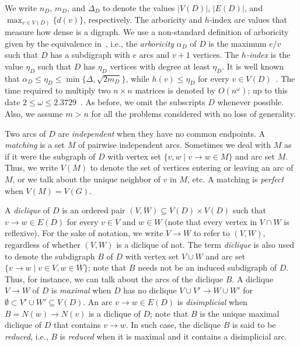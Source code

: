 \documentclass[a4paper,11pt]{article}
\begin{document}
We write $n_D$, $m_D$, and $\Delta_D$ to denote the values $|V(D)|$, $|E(D)|$, and $\max_{v \in V(D)}\{d(v)\}$, respectively.  The arboricity and $h$-index are values that measure how dense is a digraph.  We use a non-standard definition of arboricity given by the equivalence in~\cite{Nash-WilliamsJLMS1964}, i.e., the \emph{arboricity} $\alpha_D$ of $D$ is the maximum $e/v$ such that $D$ has a subdigraph with $e$ arcs and $v+1$ vertices.  The \emph{$h$-index} is the value $\eta_D$ such that $D$ has $\eta_D$ vertices with degree at least $\eta_D$.  It is well known that $\alpha_D \leq \eta_D \leq \min\{\Delta, \sqrt{2m_D}\}$, while $h(v) \leq \eta_D$ for every $v \in V(D)$~\cite{ChibaNishizekiSJC1985,LinSoulignacSzwarcfiterTCS2012}.  The time required to multiply two $n\times n$ matrices is denoted by $O(n^\omega)$; up to this date  $2 \leq \omega \leq 2.3729$~\cite{Williams2012}.  As before, we omit the subscripts $D$ whenever possible.  Also, we assume $m > n$ for all the problems considered with no loss of generality.

Two arcs of $D$ are \emph{independent} when they have no common endpoints.  A \emph{matching} is a set $M$ of pairwise independent arcs.  Sometimes we deal with $M$ as if it were the subgraph of $D$ with vertex set $\{v,w \mid v\to w\in M\}$ and arc set $M$.  Thus, we write $V(M)$ to denote the set of vertices entering or leaving an arc of $M$, or we talk about the unique neighbor of $v$ in $M$, etc.  A matching is \emph{perfect} when $V(M) = V(G)$.  

A \emph{diclique} of $D$ is an ordered pair $(V, W) \subseteq V(D) \times V(D)$ such that $v \to w \in E(D)$ for every $v \in V$ and $w \in W$ (note that every vertex in $V \cap W$ is reflexive).  For the sake of notation, we write $V \to W$ to refer to $(V, W)$, regardless of whether $(V, W)$ is a diclique of not.  The term \emph{diclique} is also used to denote the subdigraph $B$ of $D$ with vertex set $V \cup W$ and arc set $\{v \to w \mid v \in V, w \in W\}$; note that $B$ needs not be an induced subdigraph of $D$.  Thus, for instance, we can talk about the arcs of the diclique $B$.  A diclique $V \to W$ of $D$ is \emph{maximal} when $D$ has no diclique $V \cup V' \to W \cup W'$ for $\emptyset \subset V' \cup W' \subseteq V(D)$.  An arc $v\to w \in E(D)$ is \emph{disimplicial} when $B = N(w) \to N(v)$ is a diclique of $D$; note that $B$ is the unique maximal diclique of $D$ that contains $v \to w$.  In such case, the diclique $B$ is said to be \emph{reduced}, i.e., $B$ is \emph{reduced} when it is maximal and it contains a disimplicial arc.
\end{document}
